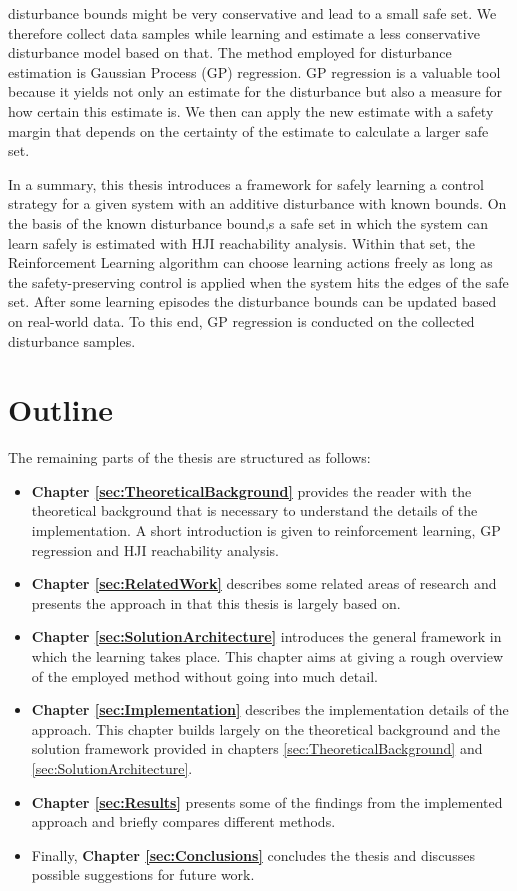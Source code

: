\documentclass[../main.tex]{subfiles}
\begin{document}
disturbance bounds might be very conservative and lead to a small safe set. We therefore collect data samples while learning and estimate a less conservative disturbance model based on that. The method employed for disturbance estimation is Gaussian Process (GP) regression. GP regression is a valuable tool because it yields not only an estimate for the disturbance but also a measure for how certain this estimate is. We then can apply the new estimate with a safety margin that depends on the certainty of the estimate to calculate a larger safe set.

In a summary, this thesis introduces a framework for safely learning a control strategy for a given system with an additive disturbance with known bounds. On the basis of the known disturbance bound,s a safe set in which the system can learn safely is estimated with HJI reachability analysis. Within that set, the Reinforcement Learning algorithm can choose learning actions freely as long as the safety-preserving control is applied when the system hits the edges of the safe set. After some learning episodes the disturbance bounds can be updated based on real-world data. To this end, GP regression is conducted on the collected disturbance samples. 

\section{Outline}
The remaining parts of the thesis are structured as follows:
\begin{itemize}
\item \textbf{Chapter \ref{sec:TheoreticalBackground}} provides the reader with the theoretical background that is necessary to understand the details of the implementation. A short introduction is given to reinforcement learning, GP regression and HJI reachability analysis.
\item \textbf{Chapter \ref{sec:RelatedWork}} describes some related areas of research and presents the approach in \cite{akametalu2014reachability} that this thesis is largely based on.
\item \textbf{Chapter \ref{sec:SolutionArchitecture}} introduces the general framework in which the learning takes place. This chapter aims at giving a rough overview of the employed method without going into much detail.
\item \textbf{Chapter \ref{sec:Implementation}} describes the implementation details of the approach. This chapter builds largely on the theoretical background and the solution framework provided in chapters \ref{sec:TheoreticalBackground} and \ref{sec:SolutionArchitecture}.
\item  \textbf{Chapter \ref{sec:Results}} presents some of the findings from the implemented approach and briefly compares different methods.
\item Finally, \textbf{Chapter \ref{sec:Conclusions}} concludes the thesis and discusses possible suggestions for future work.
\end{itemize}
\end{document}
